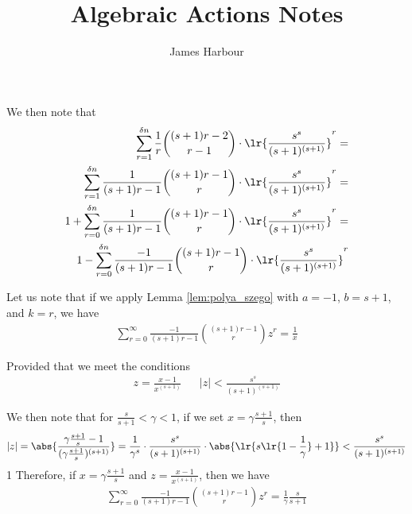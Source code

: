 \documentclass[12pt]{article}
\title{Algebraic Actions Notes}
\author{James Harbour}
\begin{document}
\maketitle

    We then note that
    \begin{equation}\begin{split}
        \sum_{r=1}^{\delta n} \frac{1}{r} {(s+1)r-2 \choose r-1} \cdot \lr{\frac{s^s}{(s+1)^{(s+1)}}}^{r} = \\
        \sum_{r=1}^{\delta n} \frac{1}{(s+1)r-1} {(s+1)r-1 \choose r} \cdot \lr{\frac{s^s}{(s+1)^{(s+1)}}}^{r} = \\
        1 + \sum_{r=0}^{\delta n} \frac{1}{(s+1)r-1} {(s+1)r-1 \choose r} \cdot \lr{\frac{s^s}{(s+1)^{(s+1)}}}^{r} = \\
        1 - \sum_{r=0}^{\delta n} \frac{-1}{(s+1)r-1} {(s+1)r-1 \choose r} \cdot \lr{\frac{s^s}{(s+1)^{(s+1)}}}^{r}
    \end{split}\end{equation}
    
    Let us note that if we apply Lemma \ref{lem:polya_szego} with $a = -1$, $b = s+1$, and $k = r$, we have
    \begin{equation}\begin{split}
        \sum_{r=0}^{\infty} \frac{-1}{(s+1)r-1} {(s+1)r - 1 \choose r} z^r = \frac{1}{x}
    \end{split}\end{equation}

    Provided that we meet the conditions
    \begin{align}
        z = \frac{x - 1}{x^{(s+1)}} && |z| < \frac{s^s}{(s+1)^{(s+1)}}
    \end{align}
    
       We then note that for $\frac{s}{s+1} < \gamma < 1$, if we set $x = \gamma \frac{s+1}{s}$, then
    \begin{equation}\begin{split}
        |z| = \abs{\frac{\gamma \frac{s+1}{s} - 1}{(\gamma \frac{s+1}{s})^{(s+1)}}} = \frac{1}{\gamma^s} \cdot \frac{s^s}{(s+1)^{(s+1)}} \cdot \abs{\lr{s\lr{1 - \frac{1}{\gamma}} + 1}} < \frac{s^s}{(s+1)^{(s+1)}}
    \end{split}\end{equation}1
        Therefore, if $x = \gamma \frac{s+1}{s}$ and $z = \frac{x - 1}{x^{(s+1)}}$, then we have
    \begin{equation}\begin{split}
        \sum_{r=0}^{\infty} \frac{-1}{(s+1)r-1} {(s+1)r - 1 \choose r} z^r = \frac{1}{\gamma } \frac{s}{s+1}
    \end{split}\end{equation}
\end{document}
